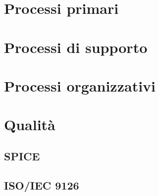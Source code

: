 \documentclass[a4paper, oneside, openany, dvipsnames, table]{article}
\begin{document}
\copertina{}
\newpage

\newpage
\tableofcontents
\newpage
\listoffigures
\newpage
\listoftables
\newpage
	
\section{Processi primari}
	
	
 
\newpage
\section{Processi di supporto}


\newpage
\section{Processi organizzativi}





\appendix
{}

\newpage
\newpage
\section{Qualità}
	\subsection{SPICE}
		\label{app:SPICE}
		
	\subsection{ISO/IEC 9126}
		\label{app:ISO/IEC 9126}
		
\end{document}
